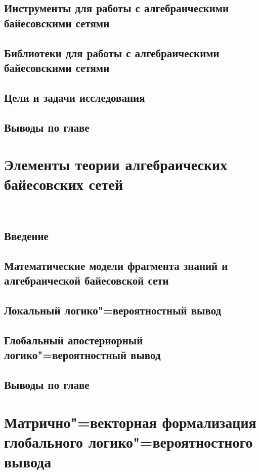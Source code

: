 \documentclass[14pt]{matmex-diploma-custom}
\begin{document}
\subsection{Инструменты для работы с алгебраическими байесовскими сетями}

\subsection{Библиотеки для работы с алгебраическими байесовскими сетями}

\subsection{Цели и задачи исследования}

\subsection{Выводы по главе}


\section{Элементы теории алгебраических байесовских сетей}\
\subsection{Введение}

\subsection{Математические модели фрагмента знаний и алгебраической байесовской сети}

\subsection{Локальный логико"=вероятностный вывод}

\subsection{Глобальный апостериорный логико"=вероятностный вывод}

\subsection{Выводы по главе}



\section{Матрично"=векторная  формализация глобального логико"=вероятностного вывода}\label{cap3}
\end{document}
